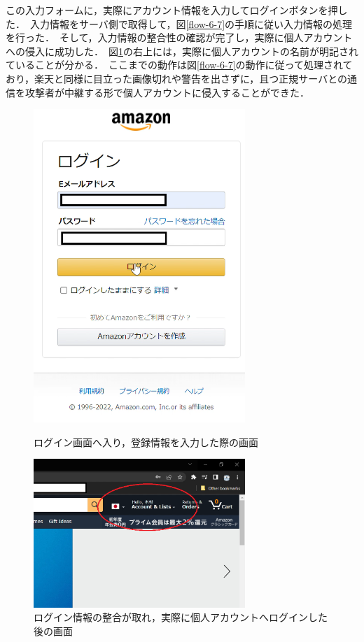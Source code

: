 \documentclass[dvipdfmx,twocolumn,9pt]{jsarticle}
\begin{document}
                この入力フォームに，実際にアカウント情報を入力してログインボタンを押した．\
                入力情報をサーバ側で取得して，図\ref{flow-6-7}の手順に従い入力情報の処理を行った．\
                そして，入力情報の整合性の確認が完了し，実際に個人アカウントへの侵入に成功した．\
                図\ref{amazon-03}の右上には，実際に個人アカウントの名前が明記されていることが分かる．\
                ここまでの動作は図\ref{flow-6-7}の動作に従って処理されており，楽天と同様に目立った画像切れや警告を出さずに，且つ正規サーバとの通信を攻撃者が中継する形で個人アカウントに侵入することができた．\
                \begin{figure}[h]
                    \centering
                    \includegraphics[width=8cm]{img/amazon/amazon-02.png}
                    \caption{ログイン画面へ入り，登録情報を入力した際の画面}
                    \label{amazon-02}
                    \includegraphics[width=8cm]{img/amazon/amazon-03.png}
                    \caption{ログイン情報の整合が取れ，実際に個人アカウントへログインした後の画面}
                    \label{amazon-03}
                \end{figure}
\end{document}
